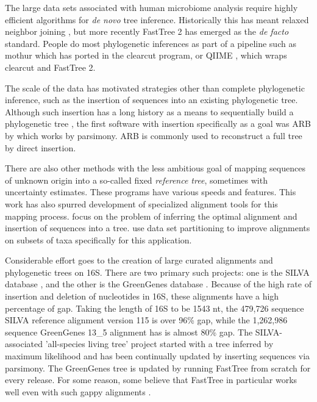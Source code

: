 \documentclass{amsart}
\begin{document}
The large data sets associated with human microbiome analysis require highly efficient algorithms for \emph{de novo} tree inference.
Historically this has meant relaxed neighbor joining \citep{evans2006relaxed}, but more recently FastTree 2 \citep{price2010fasttree} has emerged as the \textit{de facto} standard.
People do most phylogenetic inferences as part of a pipeline such as mothur \citep{schloss2009introducing} which has ported in the clearcut \citep{sheneman2006clearcut} program, or QIIME \citep{caporaso2010qiime}, which wraps clearcut and FastTree 2.

The scale of the data has motivated strategies other than complete phylogenetic inference, such as the insertion of sequences into an existing phylogenetic tree.
Although such insertion has a long history as a means to sequentially build a phylogenetic tree \citep{kluge1969quantitative}, the first software with insertion specifically as a goal was ARB by \citet{ludwig2004arb} which works by parsimony.
ARB is commonly used to reconstruct a full tree by direct insertion.

There are also other methods with the less ambitious goal of mapping sequences of unknown origin into a so-called fixed \textit{reference tree}, sometimes with uncertainty estimates.
These programs \citep{wu2008simple,monierEaLargeViruses08,vonMeringEaQuantitative08,stark2010mltreemap,matsen2010pplacer,berger2011performance} have various speeds and features.
This work has also spurred development of specialized alignment tools for this mapping process.
\citet{berger2011aligning} focus on the problem of inferring the optimal alignment and insertion of sequences into a tree.
\citet{mirarabsepp} use data set partitioning to improve alignments on subsets of taxa specifically for this application.

Considerable effort goes to the creation of large curated alignments and phylogenetic trees on 16S.
There are two primary such projects: one is the SILVA database \citep{pruesse2007silva,quast2013silva}, and the other is the GreenGenes database \citep{desantis2006greengenes,mcdonald2011improved}.
Because of the high rate of insertion and deletion of nucleotides in 16S, these alignments have a high percentage of gap.
Taking the length of 16S to be 1543 nt,
the 479,726 sequence SILVA reference alignment version 115 is over 96\% gap,
while the 1,262,986 sequence GreenGenes 13\_5 alignment has is almost 80\% gap.
The SILVA-associated 'all-species living tree' project \citep{yarza2008all} started with a tree inferred by maximum likelihood and has been continually updated  by inserting sequences via parsimony.
The GreenGenes tree is updated by running FastTree from scratch for every release.
For some reason, some believe that FastTree in particular works well even with such gappy alignments \citep[e.g.][]{sharpton2011phylotu}.
\end{document}
